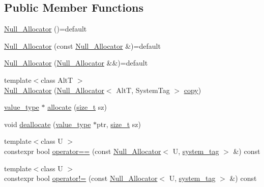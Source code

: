 \subsection*{Public Member Functions}
\begin{DoxyCompactItemize}
\item 
\hyperlink{structbc_1_1allocators_1_1Null__Allocator_a8598c55919a51313080d6eba7020ecaa}{Null\+\_\+\+Allocator} ()=default
\item 
\hyperlink{structbc_1_1allocators_1_1Null__Allocator_a92db1e5e99f7a57c0dc260a40470ba86}{Null\+\_\+\+Allocator} (const \hyperlink{structbc_1_1allocators_1_1Null__Allocator}{Null\+\_\+\+Allocator} \&)=default
\item 
\hyperlink{structbc_1_1allocators_1_1Null__Allocator_a9e023aa05e3b2737cff40658bac42a34}{Null\+\_\+\+Allocator} (\hyperlink{structbc_1_1allocators_1_1Null__Allocator}{Null\+\_\+\+Allocator} \&\&)=default
\item 
{\footnotesize template$<$class AltT $>$ }\\\hyperlink{structbc_1_1allocators_1_1Null__Allocator_a88355ca3599adc8fa3379b8ebe3eba0d}{Null\+\_\+\+Allocator} (\hyperlink{structbc_1_1allocators_1_1Null__Allocator}{Null\+\_\+\+Allocator}$<$ AltT, System\+Tag $>$ \hyperlink{tensor__utility_8h_aef49432640ea9d0daf2be2cb6e2bd5f7}{copy})
\item 
\hyperlink{structbc_1_1allocators_1_1Null__Allocator_ac6562bbd777fc64599fdc6720f093815}{value\+\_\+type} $\ast$ \hyperlink{structbc_1_1allocators_1_1Null__Allocator_ad893e775d3e098a089d22e818a3bbc50}{allocate} (\hyperlink{structbc_1_1allocators_1_1Null__Allocator_a24ad862d692b0676b201e15a3d18b53e}{size\+\_\+t} sz)
\item 
void \hyperlink{structbc_1_1allocators_1_1Null__Allocator_a2c4a4fa554ab78a37bd18e3b0d85ac7d}{deallocate} (\hyperlink{structbc_1_1allocators_1_1Null__Allocator_ac6562bbd777fc64599fdc6720f093815}{value\+\_\+type} $\ast$ptr, \hyperlink{structbc_1_1allocators_1_1Null__Allocator_a24ad862d692b0676b201e15a3d18b53e}{size\+\_\+t} sz)
\item 
{\footnotesize template$<$class U $>$ }\\constexpr bool \hyperlink{structbc_1_1allocators_1_1Null__Allocator_a4543c27c3430516aa1b27e9c1b5f0601}{operator==} (const \hyperlink{structbc_1_1allocators_1_1Null__Allocator}{Null\+\_\+\+Allocator}$<$ U, \hyperlink{structbc_1_1allocators_1_1Null__Allocator_a5accbd7634ecdda0a5dbf54c28815e9e}{system\+\_\+tag} $>$ \&) const
\item 
{\footnotesize template$<$class U $>$ }\\constexpr bool \hyperlink{structbc_1_1allocators_1_1Null__Allocator_a83c71959a26d79cc9c45715909834c53}{operator!=} (const \hyperlink{structbc_1_1allocators_1_1Null__Allocator}{Null\+\_\+\+Allocator}$<$ U, \hyperlink{structbc_1_1allocators_1_1Null__Allocator_a5accbd7634ecdda0a5dbf54c28815e9e}{system\+\_\+tag} $>$ \&) const
\end{DoxyCompactItemize}


